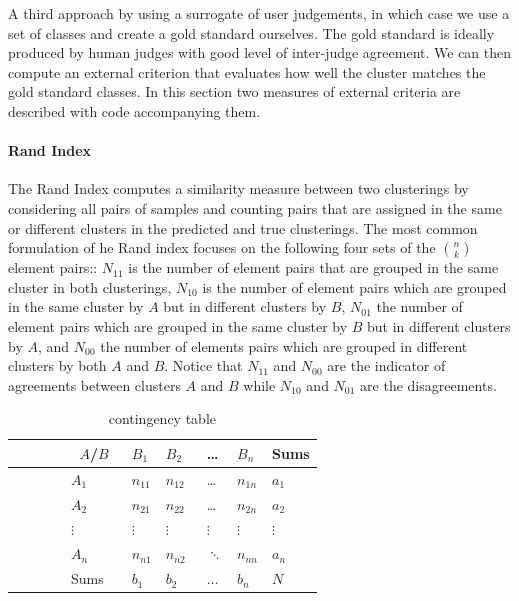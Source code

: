 \documentclass{book}
\begin{document}
A third approach by using a surrogate of user judgements, in which case we use a set of classes and create a gold standard ourselves. The gold standard is ideally produced by human judges with good level of inter-judge agreement. We can then compute an external criterion that evaluates how well the cluster matches the gold standard classes. In this section two measures of external criteria are described with code accompanying them.

\paragraph{Rand Index}%
The Rand Index computes a similarity measure between two clusterings by considering all pairs of samples and counting pairs that are assigned in the same or different clusters in the predicted and true clusterings. The most common formulation of he Rand index focuses on the following four sets of the $\binom nk$ element pairs:: $N_{11}$ is the number of element pairs that are grouped in the same cluster in both clusterings, $N_{10}$ is the number of element pairs which are grouped in the same cluster by $A$ but in different clusters by $B$, $N_{01}$ the number of element pairs which are grouped in the same cluster by $B$ but in different clusters by $A$, and $N_{00}$ the number of elements pairs which are grouped in different clusters by both $A$ and $B$. Notice that $N_{11}$ and $N_{00}$ are the indicator of agreements between clusters $A$ and $B$ while $N_{10}$ and $N_{01}$ are the disagreements.

\begin{table}[htpb]
	\centering
	\caption{contingency table}
	\label{tab:label}
	\begin{tabular}{|l|l|l|l|l|l|}
            $A$/$B$ & $B_1$    & $B_2$    & \dots  & $B_n$    & Sums  \\ \hline
            $A_1$   & $n_{11}$ & $n_{12}$ & \dots  & $n_{1n}$ & $a_1$ \\
            $A_2$   & $n_{21}$ & $n_{22}$ & \dots  & $n_{2n}$ & $a_2$ \\
            $\vdots$  & $\vdots$   & $\vdots$   & $\vdots$ & $\vdots$   & $\vdots$ \\
            $A_n$   & $n_{n1}$ & $n_{n2}$ & $\ddots$ & $n_{nn}$ & $a_n$ \\ \hline
            Sums    & $b_1$    & $b_2$    & $\dots$  & $b_n$    & $N$
	\end{tabular}
\end{table}
\end{document}
